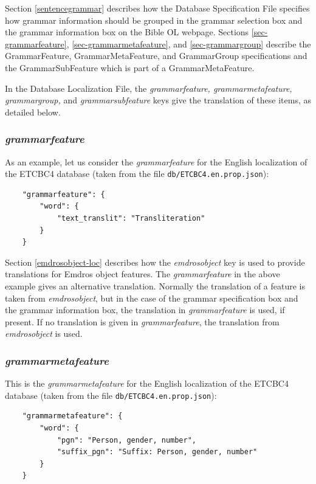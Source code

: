 \documentclass[11pt,oneside,a4paper]{memoir}
\begin{document}
Section \ref{sentencegrammar} describes how the Database Specification File specifies how grammar
information should be grouped in the grammar selection box and the grammar information box on the
Bible OL webpage. Sections \ref{sec-grammarfeature}, \ref{sec-grammarmetafeature}, and \ref{sec-grammargroup} describe the GrammarFeature,
GrammarMetaFeature, and GrammarGroup specifications and the GrammarSubFeature which is part of a
GrammarMetaFeature.

In the Database Localization File, the \emph{grammarfeature, grammarmetafeature, grammargroup,} and
\emph{grammarsubfeature} keys give the translation of these items, as detailed below.

\subsubsection{\emph{grammarfeature}}

As an example, let us consider the \emph{grammarfeature} for the English localization of the
ETCBC4 database (taken from the file \texttt{db/ETCBC4.en.prop.json}):

\begin{lstlisting}
    "grammarfeature": {
        "word": {
            "text_translit": "Transliteration"
        }
    }
\end{lstlisting}

Section \ref{emdrosobject-loc} describes how the \emph{emdrosobject} key is used to provide
translations for Emdros object features. The \emph{grammarfeature} in the above example gives an
alternative translation. Normally the translation of a feature is taken from \emph{emdrosobject},
but in the case of the grammar specification box and the grammar information box, the translation in
\emph{grammarfeature} is used, if present. If no translation is given in \emph{grammarfeature}, the
translation from \emph{emdrosobject} is used.


\subsubsection{\emph{grammarmetafeature}}

This is the \emph{grammarmetafeature} for the English localization of the
ETCBC4 database (taken from the file \texttt{db/ETCBC4.en.prop.json}):

\begin{lstlisting}
    "grammarmetafeature": {
        "word": {
            "pgn": "Person, gender, number",
            "suffix_pgn": "Suffix: Person, gender, number"
        }
    }
\end{lstlisting}
\end{document}
